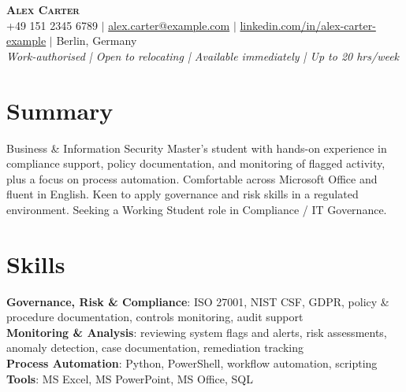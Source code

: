 \documentclass[letterpaper,11pt]{article}
\begin{document}
\begin{center}
    \textbf{\Huge \scshape Alex Carter} \\ \vspace{1pt}
    \small +49 151 2345 6789 $|$ \href{mailto:alex.carter@example.com}{alex.carter@example.com} $|$ \href{https://linkedin.com/in/alex-carter-example}{linkedin.com/in/alex-carter-example} $|$ Berlin, Germany
    \\ \vspace{1pt}
    \small\textit{Work-authorised | Open to relocating | Available immediately | Up to 20 hrs/week}
\end{center}

\section{Summary}
\begin{itemize}[leftmargin=0.15in, label={}]
    \small{\item{Business \& Information Security Master's student with hands-on experience in compliance support, policy documentation, and monitoring of flagged activity, plus a focus on process automation. Comfortable across Microsoft Office and fluent in English. Keen to apply governance and risk skills in a regulated environment. Seeking a Working Student role in Compliance / IT Governance.}}
\end{itemize}

\section{Skills}
\begin{itemize}[leftmargin=0.15in, label={}]
    \small{\item{
      \textbf{Governance, Risk \& Compliance}{: ISO 27001, NIST CSF, GDPR, policy \& procedure documentation, controls monitoring, audit support} \\
      \textbf{Monitoring \& Analysis}{: reviewing system flags and alerts, risk assessments, anomaly detection, case documentation, remediation tracking} \\
      \textbf{Process Automation}{: Python, PowerShell, workflow automation, scripting} \\
      \textbf{Tools}{: MS Excel, MS PowerPoint, MS Office, SQL}
    }}
\end{itemize}

\end{document}
